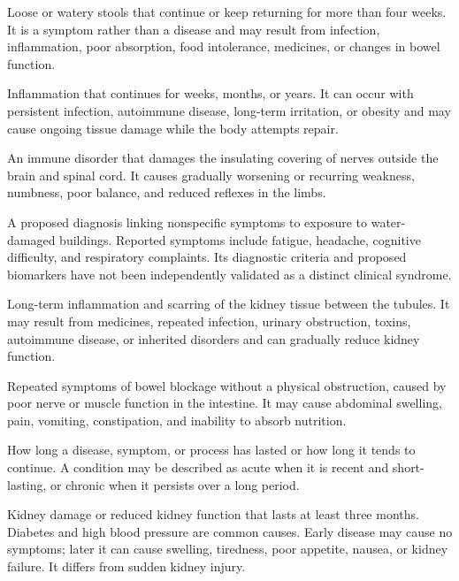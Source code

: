  Loose or watery stools that continue or keep
  returning for more than four weeks. It is a symptom rather than a
  disease and may result from infection, inflammation, poor absorption,
  food intolerance, medicines, or changes in bowel function.

 Inflammation that continues for weeks, months, or years. It can occur with persistent infection, autoimmune disease, long-term irritation, or obesity and may cause ongoing tissue damage while the body attempts repair.

 An immune disorder that damages the insulating covering of nerves outside the brain and spinal cord. It causes gradually worsening or recurring weakness, numbness, poor balance, and reduced reflexes in the limbs.

 A proposed diagnosis linking
nonspecific symptoms to exposure to water-damaged buildings. Reported symptoms
include fatigue, headache, cognitive difficulty, and respiratory complaints.
Its diagnostic criteria and proposed biomarkers have not been independently
validated as a distinct clinical syndrome.

 Long-term inflammation and scarring of the kidney tissue between the tubules. It may result from medicines, repeated infection, urinary obstruction, toxins, autoimmune disease, or inherited disorders and can gradually reduce kidney function.

 Repeated symptoms of bowel blockage without a physical obstruction, caused by poor nerve or muscle function in the intestine. It may cause abdominal swelling, pain, vomiting, constipation, and inability to absorb nutrition.

 How long a disease, symptom, or process has lasted or how long it tends to continue. A condition may be described as acute when it is recent and short-lasting, or chronic when it persists over a long period.

 Kidney damage or reduced kidney function that lasts at least three months. Diabetes and high blood pressure are common causes. Early disease may cause no symptoms; later it can cause swelling, tiredness, poor appetite, nausea, or kidney failure. It differs from sudden kidney injury.

